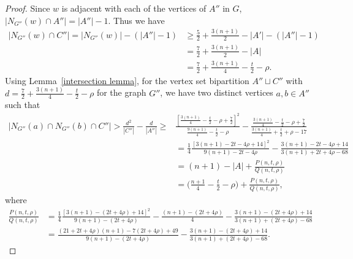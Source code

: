\documentclass[reqno,10pt]{amsart}
\theoremstyle{definition}
\begin{document}
\begin{proof}
Since $w$ is adjacent with each of the vertices of $A''$ in $G$, $|N_{G''}(w)\cap A''|=|A''|-1$. Thus we have
\begin{align*}
 |N_{G''}(w)\cap C''|=|N_{G''}(w)|- (|A''|-1)&\geq \frac{5}{2}+\frac{3(n+1)}{2}-|A'|-(|A''|-1)\\
 &=\frac{7}{2}+\frac{3(n+1)}{2}-|A|\\
 &=\frac{7}{2}+\frac{3(n+1)}{4}-\frac{t}{2}-\rho.   
\end{align*}
Using Lemma~\ref{intersection lemma}, for the vertex set bipartition $A''\sqcup C''$ with $d=\frac{7}{2}+\frac{3(n+1)}{4}-\frac{t}{2}-\rho$ for the graph $G''$, we have two distinct vertices $a,b\in A''$ such that 
\begin{align*}
|N_{G''}(a)\cap N_{G''}(b)\cap C''|>\frac{d^{2}}{|C''|}-\frac{d}{|A''|}\geq&\frac{[\frac{3(n+1)}{4}-\frac{t}{2}-\rho+\frac{7}{2}]^{2}}{\frac{9(n+1)}{4}-\frac{t}{2}-\rho}-\frac{\frac{3(n+1)}{4}-\frac{t}{2}-\rho+\frac{7}{2}}{\frac{3(n+1)}{4}+\frac{t}{2}+\rho-17}\\
 &=\frac{1}{4}\frac{[3(n+1)-2t-4\rho+14]^{2}}{9(n+1)-2t-4\rho}-\frac{3(n+1)-2t-4\rho+14}{3(n+1)+2t+4\rho-68}\\
 &=(n+1)-|A|+\frac{P(n,t,\rho)}{Q(n,t,\rho)}\\
 &=\bigg(\frac{n+1}{4}-\frac{t}{2}-\rho\bigg)+\frac{P(n,t,\rho)}{Q(n,t,\rho)},
\end{align*}
where
\begin{align*}
\frac{P(n,t,\rho)}{Q(n,t,\rho)}&=\frac{1}{4}\frac{[3(n+1)-(2t+4\rho)+14]^{2}}{9(n+1)-(2t+4\rho)}-\frac{(n+1)-(2t+4\rho)}{4}-\frac{3(n+1)-(2t+4\rho)+14}{3(n+1)+(2t+4\rho)-68}\\
&=\frac{(21+2t+4\rho)(n+1)-7(2t+4\rho)+49}{9(n+1)-(2t+4\rho)}-\frac{3(n+1)-(2t+4\rho)+14}{3(n+1)+(2t+4\rho)-68}.
\end{align*}


\end{proof}
\end{document}
